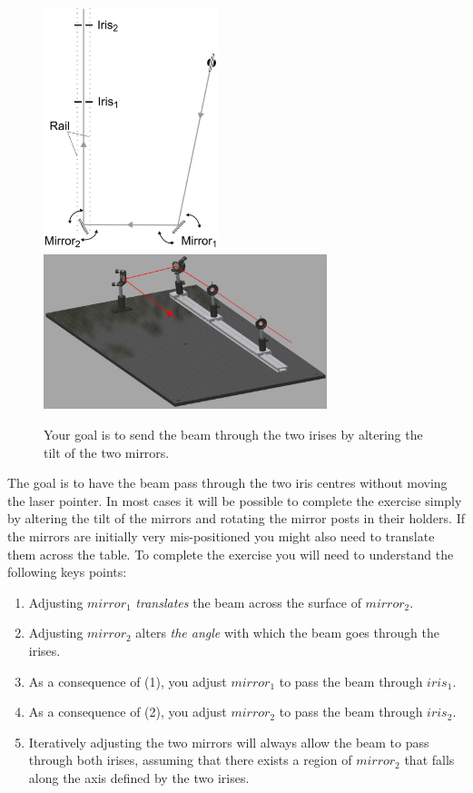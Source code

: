\documentclass[a4paper]{report}
\begin{document}
\begin{figure}[h]
\center
\includegraphics[width=2.0in]{laser_alignment_exercise_basic.eps}
\includegraphics[width=3.25in]{alignment_CAD_01.eps}
\caption{Your goal is to send the beam through the two irises by altering the tilt of the two mirrors.}
\label{fig:ex1}
\end{figure}


The goal is to have the beam pass through the two iris centres without moving the laser pointer. 
In most cases it will be possible to complete the exercise simply by altering the tilt of the mirrors and rotating the mirror posts in their holders. 
If the mirrors are initially very mis-positioned you might also need to translate them across the table. 
To complete the exercise you will need to understand the following keys points:

\begin{enumerate}
\item Adjusting $mirror_1$ \textit{translates} the beam across the surface of $mirror_2$.
\item Adjusting $mirror_2$ alters \textit{the angle} with which the beam goes through the irises. 
\item As a consequence of (1), you adjust $mirror_1$ to pass the beam through $iris_1$.
\item As a consequence of (2), you adjust $mirror_2$ to pass the beam through $iris_2$.
\item Iteratively adjusting the two mirrors will always allow the beam to pass through both irises, assuming that there exists a region of $mirror_2$ that falls along the axis defined by the two irises. 
\end{enumerate}
\end{document}
